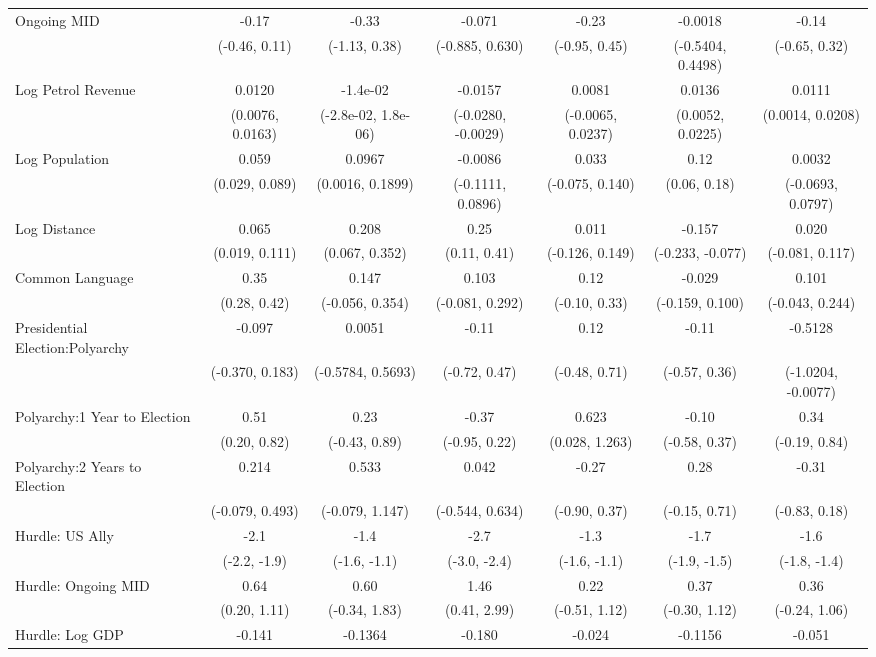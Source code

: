 \begin{table}[H]
\begin{tabular}[t]{lcccccc}
Ongoing MID & -0.17 & -0.33 & -0.071 & -0.23 & -0.0018 & -0.14\\
 & (-0.46, 0.11) & (-1.13, 0.38) & (-0.885, 0.630) & (-0.95, 0.45) & (-0.5404, 0.4498) & (-0.65, 0.32)\\
Log Petrol Revenue & 0.0120 & -1.4e-02 & -0.0157 & 0.0081 & 0.0136 & 0.0111\\
 & (0.0076, 0.0163) & (-2.8e-02, 1.8e-06) & (-0.0280, -0.0029) & (-0.0065, 0.0237) & (0.0052, 0.0225) & (0.0014, 0.0208)\\
Log Population & 0.059 & 0.0967 & -0.0086 & 0.033 & 0.12 & 0.0032\\
 & (0.029, 0.089) & (0.0016, 0.1899) & (-0.1111, 0.0896) & (-0.075, 0.140) & (0.06, 0.18) & (-0.0693, 0.0797)\\
Log Distance & 0.065 & 0.208 & 0.25 & 0.011 & -0.157 & 0.020\\
 & (0.019, 0.111) & (0.067, 0.352) & (0.11, 0.41) & (-0.126, 0.149) & (-0.233, -0.077) & (-0.081, 0.117)\\
Common Language & 0.35 & 0.147 & 0.103 & 0.12 & -0.029 & 0.101\\
 & (0.28, 0.42) & (-0.056, 0.354) & (-0.081, 0.292) & (-0.10, 0.33) & (-0.159, 0.100) & (-0.043, 0.244)\\
Presidential Election:Polyarchy & -0.097 & 0.0051 & -0.11 & 0.12 & -0.11 & -0.5128\\
 & (-0.370, 0.183) & (-0.5784, 0.5693) & (-0.72, 0.47) & (-0.48, 0.71) & (-0.57, 0.36) & (-1.0204, -0.0077)\\
Polyarchy:1 Year to Election & 0.51 & 0.23 & -0.37 & 0.623 & -0.10 & 0.34\\
 & (0.20, 0.82) & (-0.43, 0.89) & (-0.95, 0.22) & (0.028, 1.263) & (-0.58, 0.37) & (-0.19, 0.84)\\
Polyarchy:2 Years to Election & 0.214 & 0.533 & 0.042 & -0.27 & 0.28 & -0.31\\
 & (-0.079, 0.493) & (-0.079, 1.147) & (-0.544, 0.634) & (-0.90, 0.37) & (-0.15, 0.71) & (-0.83, 0.18)\\
Hurdle: US Ally & -2.1 & -1.4 & -2.7 & -1.3 & -1.7 & -1.6\\
 & (-2.2, -1.9) & (-1.6, -1.1) & (-3.0, -2.4) & (-1.6, -1.1) & (-1.9, -1.5) & (-1.8, -1.4)\\
Hurdle: Ongoing MID & 0.64 & 0.60 & 1.46 & 0.22 & 0.37 & 0.36\\
 & (0.20, 1.11) & (-0.34, 1.83) & (0.41, 2.99) & (-0.51, 1.12) & (-0.30, 1.12) & (-0.24, 1.06)\\
Hurdle: Log GDP & -0.141 & -0.1364 & -0.180 & -0.024 & -0.1156 & -0.051\\

\end{tabular}
\end{table}
